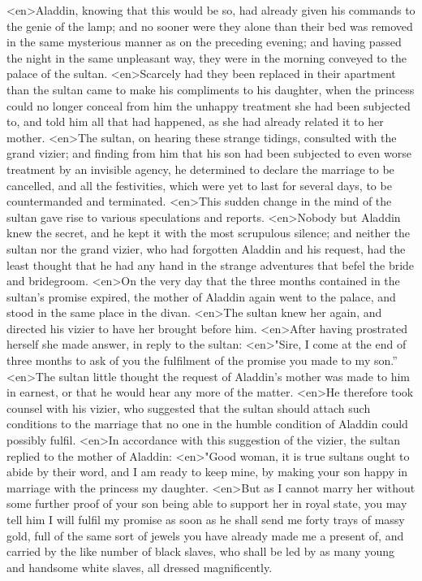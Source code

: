 <en>Aladdin, knowing that this would be so, had already given his commands to the genie of the lamp; and no sooner were they alone than their bed was removed in the same mysterious manner as on the preceding evening; and having passed the night in the same unpleasant way, they were in the morning conveyed to the palace of the sultan.
<en>Scarcely had they been replaced in their apartment than the sultan came to make his compliments to his daughter, when the princess could no longer conceal from him the unhappy treatment she had been subjected to, and told him all that had happened, as she had already related it to her mother.
<en>The sultan, on hearing these strange tidings, consulted with the grand vizier; and finding from him that his son had been subjected to even worse treatment by an invisible agency, he determined to declare the marriage to be cancelled, and all the festivities, which were yet to last for several days, to be countermanded and terminated.
<en>This sudden change in the mind of the sultan gave rise to various speculations and reports.
<en>Nobody but Aladdin knew the secret, and he kept it with the most scrupulous silence; and neither the sultan nor the grand vizier, who had forgotten Aladdin and his request, had the least thought that he had any hand in the strange adventures that befel the bride and bridegroom.
<en>On the very day that the three months contained in the sultan’s promise expired, the mother of Aladdin again went to the palace, and stood in the same place in the divan.
<en>The sultan knew her again, and directed his vizier to have her brought before him.
<en>After having prostrated herself she made answer, in reply to the sultan:
<en>"Sire, I come at the end of three months to ask of you the fulfilment of the promise you made to my son.”
<en>The sultan little thought the request of Aladdin’s mother was made to him in earnest, or that he would hear any more of the matter.
<en>He therefore took counsel with his vizier, who suggested that the sultan should attach such conditions to the marriage that no one in the humble condition of Aladdin could possibly fulfil.
<en>In accordance with this suggestion of the vizier, the sultan replied to the mother of Aladdin:
<en>"Good woman, it is true sultans ought to abide by their word, and I am ready to keep mine, by making your son happy in marriage with the princess my daughter.
<en>But as I cannot marry her without some further proof of your son being able to support her in royal state, you may tell him I will fulfil my promise as soon as he shall send me forty trays of massy gold, full of the same sort of jewels you have already made me a present of, and carried by the like number of black slaves, who shall be led by as many young and handsome white slaves, all dressed magnificently.
